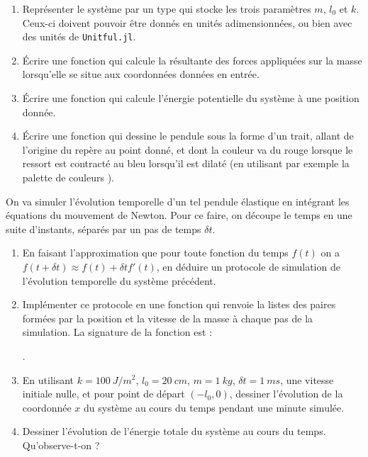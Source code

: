 \documentclass{article}
\begin{document}
\begin{enumerate}
	\item Représenter le système par un type  qui stocke les trois paramètres $m$, $l_0$ et $k$. Ceux-ci doivent pouvoir être donnés en unités adimensionnées, ou bien avec des unités de \texttt{Unitful.jl}.
	\item Écrire une fonction  qui calcule la résultante des forces appliquées sur la masse lorsqu'elle se situe aux coordonnées données en entrée.
	\item Écrire une fonction  qui calcule l'énergie potentielle du système à une position donnée.
	\item Écrire une fonction  qui dessine le pendule sous la forme d'un trait, allant de l'origine du repère au point donné, et dont la couleur va du rouge lorsque le ressort est contracté au bleu lorsqu'il est dilaté (en utilisant par exemple la palette de couleurs ).
\end{enumerate}

On va simuler l'évolution temporelle d'un tel pendule élastique en intégrant les équations du mouvement de Newton. Pour ce faire, on découpe le temps en une suite d'instants, séparés par un pas de temps $\delta t$.

\begin{enumerate}[resume]
	\item En faisant l'approximation que pour toute fonction du temps $f(t)$ on a $f(t+\delta t) \approx f(t) + \delta tf'(t)$, en déduire un protocole de simulation de l'évolution temporelle du système précédent.
	\item Implémenter ce protocole en une fonction qui renvoie la listes des paires formées par la position et la vitesse de la masse à chaque pas de la simulation. La signature de la fonction est :
	
	.
	\item En utilisant $k = \qty{100}{J/m^2}$, $l_0 = \qty{20}{cm}$, $m = \qty{1}{kg}$, $\delta t = \qty{1}{ms}$, une vitesse initiale nulle, et pour point de départ $(-l_0, 0)$, dessiner l'évolution de la coordonnée $x$ du système au cours du temps pendant une minute simulée.
	\item Dessiner l'évolution de l'énergie totale du système au cours du temps. Qu'observe-t-on ?
\end{enumerate}
\end{document}
